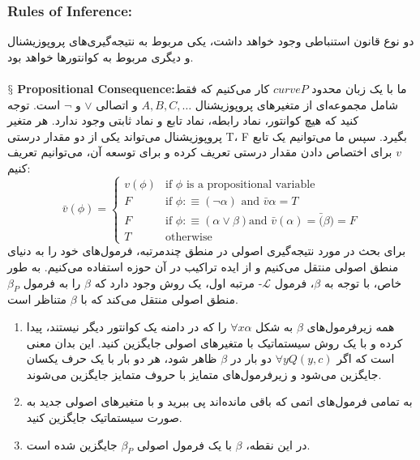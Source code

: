 \documentclass[10pt,a4paper]{article}
\newcommand{\newpoint}[1]{\indent$\mathsection$ \textbf{#1}}
\newcommand{\curveL}{\mathcal{L}}
\begin{document}
                        \subsubsection{Rules of Inference:}
دو نوع قانون استنباطی وجود خواهد داشت، یکی مربوط به نتیجه‌گیری‌های پروپوزیشنال و دیگری مربوط به کوانتورها خواهد بود.
                            \\
                            \\
                            \newpoint{Propositional Consequence:}ما با یک زبان محدود $curveP$ کار می‌کنیم که فقط شامل مجموعه‌ای از متغیرهای پروپوزیشنال $A,B,C,\dots$ و اتصالی $\lor$ و $\neg$ است. توجه کنید که هیچ کوانتور، نماد رابطه، نماد تابع و نماد ثابتی وجود ندارد. هر متغیر پروپوزیشنال می‌تواند یکی از دو مقدار درستی T، F بگیرد. سپس ما می‌توانیم یک تابع $v$ برای اختصاص دادن مقدار درستی تعریف کرده و برای توسعه آن، می‌توانیم تعریف کنیم:
                            \begin{equation}
                                \bar v(\phi) = \left\{
                                \begin{matrix}
                                    v(\phi) &\text{if } \phi \text{ is a propositional variable}
                                    \\
                                    F & \text{if } \phi:\equiv(\neg\alpha) \text{ and } \bar v{\alpha} = T
                                    \\
                                    F & \text{if } \phi:\equiv(\alpha\lor\beta) \text{and } \bar v(\alpha) = \bar (\beta) = F
                                    \\
                                    T & \text{otherwise}
                                \end{matrix}
                                \right.
                            \end{equation}
برای بحث در مورد نتیجه‌گیری اصولی در منطق چندمرتبه، فرمول‌های خود را به دنیای منطق اصولی منتقل می‌کنیم و از ایده تراکیب در آن حوزه استفاده می‌کنیم. به طور خاص، با توجه به $\beta$، فرمول $\curveL$- مرتبه اول، یک روش وجود دارد که $\beta$ را به فرمول $\beta_P$ منطق اصولی منتقل می‌کند که با $\beta$ متناظر است.
                            \begin{enumerate}
                                \item همه زیرفرمول‌های $\beta$ به شکل $\forall x\alpha$ را که در دامنه یک کوانتور دیگر نیستند، پیدا کرده و با یک روش سیستماتیک با متغیرهای اصولی جایگزین کنید. این بدان معنی است که اگر $\forall yQ(y,c)$ دو بار در $\beta$ ظاهر شود، هر دو بار با یک حرف یکسان جایگزین می‌شود و زیرفرمول‌های متمایز با حروف متمایز جایگزین می‌شوند.
                                \item به تمامی فرمول‌های اتمی که باقی مانده‌اند پی ببرید و با متغیرهای اصولی جدید به صورت سیستماتیک جایگزین کنید.
                                \item در این نقطه، $\beta$ با یک فرمول اصولی $\beta_P$ جایگزین شده است.
                            \end{enumerate}
\end{document}
